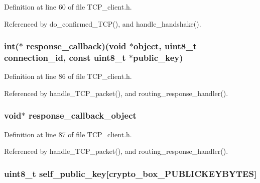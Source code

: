 Definition at line 60 of file T\+C\+P\+\_\+client.\+h.



Referenced by do\+\_\+confirmed\+\_\+\+T\+C\+P(), and handle\+\_\+handshake().

\hypertarget{struct_t_c_p___client___connection_ab32747bc59a98c0c7127293859eccb85}{
\subsubsection[{response\+\_\+callback}]{\setlength{\rightskip}{0pt plus 5cm}int($\ast$ response\+\_\+callback)(void $\ast$object, uint8\+\_\+t connection\+\_\+id, const uint8\+\_\+t $\ast${\bf public\+\_\+key})}}\label{struct_t_c_p___client___connection_ab32747bc59a98c0c7127293859eccb85}


Definition at line 86 of file T\+C\+P\+\_\+client.\+h.



Referenced by handle\+\_\+\+T\+C\+P\+\_\+packet(), and routing\+\_\+response\+\_\+handler().

\hypertarget{struct_t_c_p___client___connection_a60ca473249fab46aefe6f89158bd5a52}{
\subsubsection[{response\+\_\+callback\+\_\+object}]{\setlength{\rightskip}{0pt plus 5cm}void$\ast$ response\+\_\+callback\+\_\+object}}\label{struct_t_c_p___client___connection_a60ca473249fab46aefe6f89158bd5a52}


Definition at line 87 of file T\+C\+P\+\_\+client.\+h.



Referenced by handle\+\_\+\+T\+C\+P\+\_\+packet(), and routing\+\_\+response\+\_\+handler().

\hypertarget{struct_t_c_p___client___connection_ae726df8bdc26380e5a6c3187a00d6881}{
\subsubsection[{self\+\_\+public\+\_\+key}]{\setlength{\rightskip}{0pt plus 5cm}uint8\+\_\+t self\+\_\+public\+\_\+key\mbox{[}crypto\+\_\+box\+\_\+\+P\+U\+B\+L\+I\+C\+K\+E\+Y\+B\+Y\+T\+E\+S\mbox{]}}}\label{struct_t_c_p___client___connection_ae726df8bdc26380e5a6c3187a00d6881}


